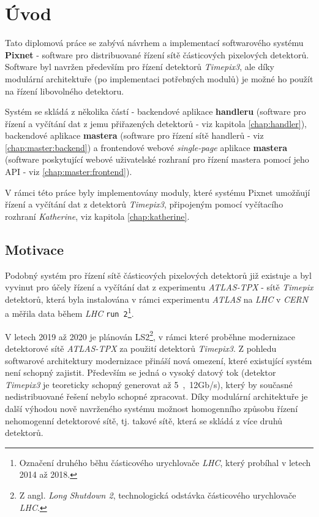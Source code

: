 

\chapter{Úvod}\label{chap01} 
Tato diplomová práce se zabývá návrhem a implementací softwarového systému \textbf{Pixnet} - software pro distribuované řízení sítě částicových pixelových detektorů. Software byl navržen především pro řízení detektorů \textit{Timepix3}, ale díky modulární architektuře (po implementaci potřebných modulů) je možné ho použít na řízení libovolného detektoru.

Systém se skládá z několika částí - backendové aplikace \textbf{handleru} (software pro řízení a vyčítání dat z jemu přiřazených detektorů - viz kapitola \ref{chap:handler}), backendové aplikace \textbf{mastera} (software pro řízení sítě handlerů - viz \ref{chap:master:backend}) a frontendové webové \textit{single-page} aplikace \textbf{mastera} (software poskytující webové uživatelské rozhraní pro řízení mastera pomocí jeho API - viz \ref{chap:master:frontend}).

V rámci této práce byly implementovány moduly, které systému Pixnet umožňují řízení a vyčítání dat z detektorů \textit{Timepix3}, připojeným pomocí vyčítacího rozhraní \textit{Katherine}, viz kapitola \ref{chap:katherine}.

\section{Motivace}
Podobný systém pro řízení sítě částicových pixelových detektorů již existuje \cite{atlastpx_sw,BegeraBcThesis2016} a byl vyvinut pro účely řízení a vyčítání dat z experimentu \textit{ATLAS-TPX} - sítě \textit{Timepix} detektorů, která byla instalována v rámci experimentu \textit{ATLAS} na \textit{LHC} v \textit{CERN} a měřila data během \textit{LHC} \texttt{run 2}\footnote{Označení druhého běhu částicového urychlovače \textit{LHC}, který probíhal v letech 2014 až 2018.}. 

V letech 2019 až 2020 je plánován LS2\footnote{Z angl. \textit{Long Shutdown 2}, technologická odstávka částicového urychlovače \textit{LHC}.}, v rámci které proběhne modernizace detektorové sítě \textit{ATLAS-TPX} za použití detektorů \textit{Timepix3}. Z pohledu softwarové architektury modernizace přináší nová omezení, které existující systém není schopný zajistit. Především se jedná o vysoký datový tok (detektor \textit{Timepix3} je teoreticky schopný generovat až \unit{5,12}{Gb/s}), který by současné nedistribuované řešení nebylo schopné zpracovat. Díky modulární architektuře je další výhodou nově navrženého systému možnost homogenního způsobu řízení nehomogenní detektorové sítě, tj. takové sítě, která se skládá z více druhů detektorů.


